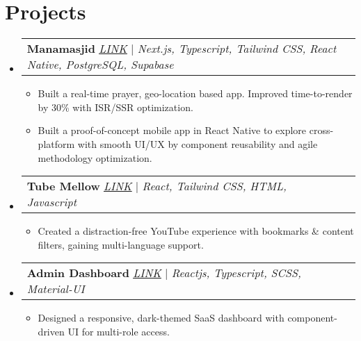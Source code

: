 \documentclass[letterpaper,11pt]{article}
\makeatletter
\newcommand{\resumeItem}[1]{
  \item\small{
    {#1 \vspace{-2pt}}
  }
}
\newcommand{\resumeProjectHeading}[2]{
    \item
    \begin{tabular*}{0.97\textwidth}{l@{\extracolsep{\fill}}r}
      \small#1 & #2 \\
    \end{tabular*}\vspace{-7pt}
}
\newcommand{\resumeSubHeadingListStart}{\begin{itemize}[leftmargin=0.15in, label={}]}
\newcommand{\resumeSubHeadingListEnd}{\end{itemize}}
\newcommand{\resumeItemListStart}{\begin{itemize}}
\newcommand{\resumeItemListEnd}{\end{itemize}\vspace{-5pt}}
\makeatother
\begin{document}
\section{Projects}
    \resumeSubHeadingListStart
     \resumeProjectHeading
          {\textbf{Manamasjid} \href{https://manamasjid.vercel.app/}{\underline{\emph{LINK}}} | \emph{Next.js, Typescript, Tailwind CSS, React Native,  PostgreSQL, Supabase}}{}
          \resumeItemListStart
            \resumeItem{Built a real-time prayer, geo-location based app. Improved time-to-render by 30\% with ISR/SSR optimization.}
            \resumeItem{Built a proof-of-concept mobile app in React Native to explore cross-platform with smooth UI/UX by component reusability and agile methodology optimization.}
          \resumeItemListEnd
      \resumeProjectHeading
          {\textbf{Tube Mellow} \href{https://chromewebstore.google.com/detail/tube-mellow/fgflinjcolmfjdkilakkcgennlkhgkgh}{\underline{\emph{LINK}}} | \emph{React, Tailwind CSS, HTML, Javascript}}{}
          \resumeItemListStart
            \resumeItem{Created a distraction-free YouTube experience with bookmarks \& content filters, gaining multi-language support.}
          \resumeItemListEnd
      \resumeProjectHeading
          {\textbf{Admin Dashboard} \href{https://admin-dashboard-hakeem.vercel.app/}{\underline{\emph{LINK}}} | \emph{Reactjs, Typescript, SCSS, Material-UI}}{}
          \resumeItemListStart
            \resumeItem{Designed a responsive, dark-themed SaaS dashboard with component-driven UI for multi-role access.}
          \resumeItemListEnd
    \resumeSubHeadingListEnd


%
\end{document}
